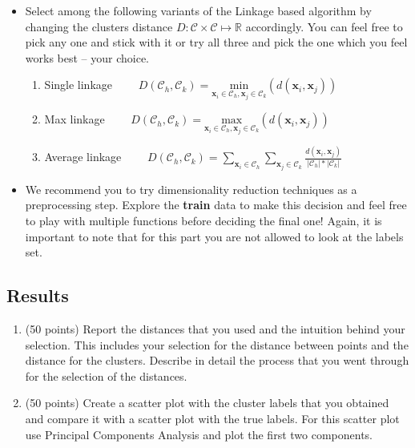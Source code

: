\documentclass{article}
\begin{document}
\begin{itemize}
\item Select among the following variants of the Linkage based algorithm by changing the clusters distance $D: \mathcal{C}\times\mathcal{C}\mapsto \mathbb{R}$ accordingly. You can feel free to pick any one and stick with it or try all three and pick the one which you feel works best -- your choice. 
    \begin{enumerate}
        \item Single linkage
        $\qquad D(\mathcal{C}_{h}, \mathcal{C}_{k})=\underset{\mathbf{x}_{i}\in \mathcal{C}_{h}, \mathbf{x}_{j}\in \mathcal{C}_{k}}{\text{min}}
            \left(d(\mathbf{x}_{i}, \mathbf{x}_{j})\right)$
        \item Max linkage
        $\qquad D(\mathcal{C}_{h}, \mathcal{C}_{k})=\underset{\mathbf{x}_{i}\in \mathcal{C}_{h}, \mathbf{x}_{j}\in \mathcal{C}_{k}}{\text{max}}
            \left(d(\mathbf{x}_{i}, \mathbf{x}_{j})\right)$
        \item Average linkage
        $\qquad D(\mathcal{C}_{h}, \mathcal{C}_{k})= \sum_{\mathbf{x}_i\in\mathcal{C}_{h}}\sum_{\mathbf{x}_j\in\mathcal{C}_{k}} \frac{d(\mathbf{x}_{i}, \mathbf{x}_{j})}{|\mathcal{C}_{h}|*|\mathcal{C}_{k}|}$
    \end{enumerate}
\item We recommend you to try dimensionality reduction techniques as a preprocessing step. Explore the \textbf{train} data to make this decision and feel free to play with multiple functions before deciding the final one! Again, it is important to note that for this part you are not allowed to look at the labels set.
\end{itemize}

\subsection{Results}
\begin{enumerate}[a]
\item (50 points) Report the distances that you used and the intuition behind your selection. This includes your selection for the distance between points and the distance for the clusters. Describe in detail the process that you went through for the selection of the distances.
\item (50 points) Create a scatter plot with the cluster labels that you obtained and compare it with a scatter plot with the true labels. For this scatter plot use Principal Components Analysis and plot the first two components.

\end{enumerate}
\end{document}
